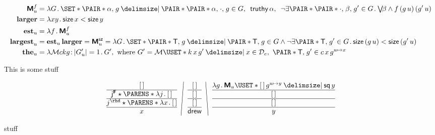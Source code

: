 \documentclass[10pt,fleqn]{article}
\newcommand{\M}{\text{\sffamily\bfseries M}}
\newcommand{\F}{\text{\sffamily\bfseries F}}
\begin{document}
\begin{minipage}[t]{0.6\textwidth} %
\begin{spreadlines}{0em}
\begin{align*}
  \M_u^f &=
  \lambda G \dt
    \set{%
      \pair{\cn{\alpha}}{g}
    \giv
      \pair{\pair{\cn{\alpha}}{\cdot}}{g} \in G
      ,\ \, 
      \cn{truthy}\,\alpha
      ,\ \, 
      \neg\exists\pair{\pair{\cdot}{\beta}}{g'} \in G \dt
        \mathsmaller{\bigvee}\!\beta \land f\,(g\,u)\,(g'\,u)
    } \\
  \textbf{larger} &=
  \lambda xy \dt \cn{size}\,x < \cn{size}\,y \\
  \textbf{est}_u &=
  \lambda f \dt \M_u^f\\
  \textbf{largest}_u &=
  \textbf{est}_u\,\textbf{larger} =
  \M_u^\cn{sz} =
  \lambda G \dt
    \set{%
      \pair{\cn{T}}{g}
    \giv
      \pair{\cn{T}}{g} \in G
      \land
      \neg\exists\pair{\cn{T}}{g'} \in G \dt
        \cn{size}\,(g\,u) < \cn{size}\,(g'\,u)
    } \\
  \textbf{the}_u &=
  \lambda\mathcal{M}ckg \col |G'_u| = 1 \dt G',
  \ \textrm{where} \ 
  G' = \mathcal{M}\uset{%
    k\,x\,g'
  \giv
    x\in \mathcal{D}_e,\ \pair{\cn{T}}{g'} \in c\,x\,g^{u\mapsto x}
  }
\end{align*}
\end{spreadlines}
\end{minipage}
%
%
\begin{minipage}[t]{0.4\textwidth}
This is some stuff

\end{minipage}

\dotfill

\begin{minipage}[t]{0.6\textwidth}
\begin{align*}
  \bitttt{\hole}{%
    \cn{j}^\F \star \p{\l j \dt \hole}
  }{%
    j^\rhd \star \p{\l x \dt \hole}
  }{x}
%
\FSL{%
  \bitttt{\hole}{\hole}{\hole}{\cn{drew}}
}
%
\BSL{%
  \bitttt{%
    \lambda g \dt
      \M_u \uset{%
        \hole\,g^{u\mapsto y}
      \giv
        \cn{sq}\,y
      }
  }{\hole}{\hole}{y}
}
\end{align*}  
\end{minipage}
%
%
\begin{minipage}[t]{0.4\textwidth}
stuff
\end{minipage}
\end{document}
